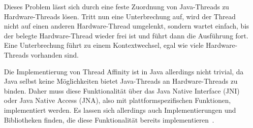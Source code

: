 \documentclass[12pt,a4paper,listof=toc,parskip=half,numbers=noenddot,abstract=true]{scrartcl}
\begin{document}
Dieses Problem lässt sich durch eine feste Zuordnung von Java-Threads zu Hardware-Threads lösen. Tritt nun eine Unterbrechung auf, wird der Thread nicht auf einen anderen Hardware-Thread umgelenkt, sondern wartet einfach, bis der belegte Hardware-Thread wieder frei ist und führt dann die Ausführung fort. Eine Unterbrechung führt zu einem Kontextwechsel, egal wie viele Hardware-Threads vorhanden sind.

Die Implementierung von Thread Affinity ist in Java allerdings nicht trivial, da Java selbst keine Möglichkeiten bietet Java-Threads an Hardware-Threads zu binden. Daher muss diese Funktionalität über das Java Native Interface (JNI) oder Java Native Access (JNA), also mit plattformspezifischen Funktionen, implementiert werden. Es lassen sich allerdings auch Implementierungen und Bibliotheken finden, die diese Funktionalität bereits implementieren~\cite{ChronicleSoftware,Cheremin2011}.

\pagebreak
{}
\printnoidxglossary[type=main,style=longheader]
\printnoidxglossary[type=acronym,style=longheader]

\pagebreak
\printbibliography[title={Literaturverzeichnis},heading=bibintoc,notkeyword=online]

\pagebreak
\printbibliography[title={Quellenverzeichnis},heading=bibintoc,keyword=online] 



\end{document}
